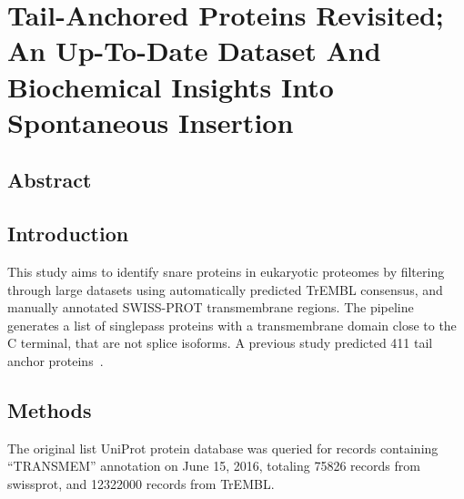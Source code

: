 \chapter{Tail-Anchored Proteins Revisited; An Up-To-Date Dataset And Biochemical Insights Into Spontaneous Insertion} %
\section{Abstract}

\section{Introduction}
This study aims to identify \gls{snare} proteins in eukaryotic proteomes by filtering through large datasets using automatically predicted TrEMBL consensus, and manually annotated SWISS-PROT transmembrane regions. The pipeline generates a list of singlepass proteins with a transmembrane domain close to the C terminal, that are not splice isoforms. A previous study predicted 411 tail anchor proteins~\cite{Kalbfleisch2007}.

\section{Methods}
The original list UniProt protein database was queried for records containing ``TRANSMEM'' annotation on June 15, 2016, totaling 75826 records from swissprot, and 12322000 records from TrEMBL.

